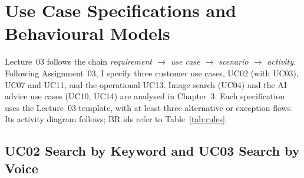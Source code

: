\section{Use Case Specifications and Behavioural Models}\label{sec:2.2}

Lecture~03 follows the chain \emph{requirement $\rightarrow$ use case $\rightarrow$ scenario $\rightarrow$
activity}. Following Assignment~03, I specify three customer use cases, UC02 (with UC03), UC07 and UC11, and the
operational UC13. Image search (UC04) and the AI advice use cases (UC10, UC14) are analysed in Chapter~3. Each
specification uses the Lecture~03 template, with at least three alternative or exception flows. Its activity
diagram follows; BR ids refer to Table~\ref{tab:rules}.

\newcommand{\specrow}[2]{\small\textbf{#1} & \small #2\\}

\subsection{UC02 Search by Keyword and UC03 Search by Voice}\label{sec:2.2.1}


